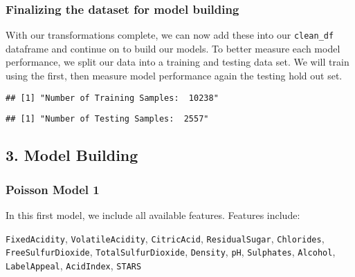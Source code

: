 \documentclass[
]{article}
\begin{document}
\hypertarget{finalizing-the-dataset-for-model-building}{%
\subsubsection{Finalizing the dataset for model
building}\label{finalizing-the-dataset-for-model-building}}

With our transformations complete, we can now add these into our
\texttt{clean\_df} dataframe and continue on to build our models. To
better measure each model performance, we split our data into a training
and testing data set. We will train using the first, then measure model
performance again the testing hold out set.

\begin{verbatim}
## [1] "Number of Training Samples:  10238"
\end{verbatim}

\begin{verbatim}
## [1] "Number of Testing Samples:  2557"
\end{verbatim}

\hypertarget{model-building}{%
\subsection{3. Model Building}\label{model-building}}

\hypertarget{poisson-model-1}{%
\subsubsection{Poisson Model 1}\label{poisson-model-1}}

In this first model, we include all available features. Features
include:

\texttt{FixedAcidity}, \texttt{VolatileAcidity}, \texttt{CitricAcid},
\texttt{ResidualSugar}, \texttt{Chlorides}, \texttt{FreeSulfurDioxide},
\texttt{TotalSulfurDioxide}, \texttt{Density}, \texttt{pH},
\texttt{Sulphates}, \texttt{Alcohol}, \texttt{LabelAppeal},
\texttt{AcidIndex}, \texttt{STARS}
\end{document}
